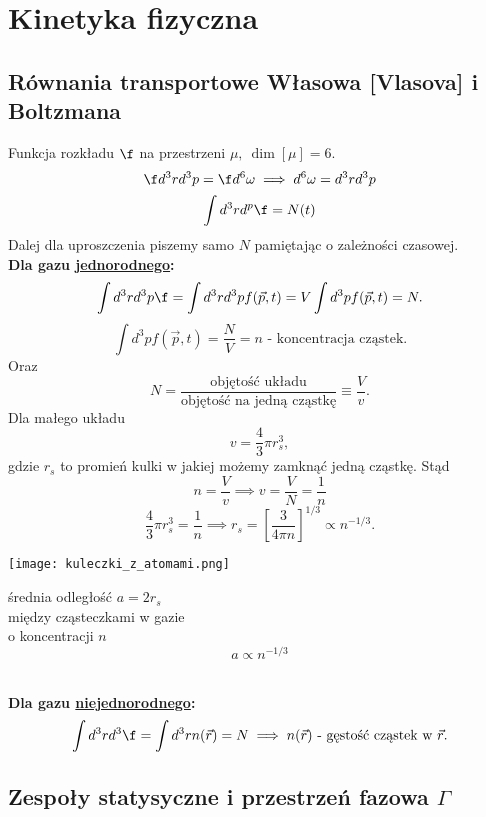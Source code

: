 \section{Kinetyka fizyczna}
\subsection{Równania transportowe Własowa [Vlasova] i Boltzmana}
Funkcja rozkładu $\f$ na przestrzeni $\mu,\ \dim[\mu]=6.$
\begin{equation} \f d^3rd^3p = \f d^6\omega \implies d^6\omega 
= d^3rd^3p \end{equation}
\begin{equation} \int d^3rd^p\f = N(t) \end{equation}
Dalej dla uproszczenia piszemy samo $N$ pamiętając o zależności czasowej.\\

\textbf{Dla gazu \underline{jednorodnego}:}
$$ \int d^3rd^3p \f = \int d^3rd^3pf(\vec{p},t) = V \int d^3p f(\vec{p},t)=N.$$
\begin{equation}
\int d^3p f(\vec{p},t) = \frac{N}{V} = n \mbox{ - koncentracja cząstek.}
\end{equation}
Oraz
\begin{equation}
N = \frac{\mbox{objętość układu}}{\mbox{objętość na jedną cząstkę}} \equiv 
\frac{V}{v}.
\end{equation}
Dla małego układu 
\begin{equation}
v=\frac{4}{3} \pi r_s^3 ,
\end{equation}
gdzie $r_s$ to promień kulki w jakiej możemy zamknąć jedną cząstkę. Stąd
$$ n = \frac{V}{v} \implies v=\frac{V}{N} = \frac{1}{n}$$
$$ \frac{4}{3} \pi r_s^3 = \frac{1}{n} \implies r_s = \left[ \frac{3}{4\pi n}
\right]^{1/3} \propto n^{-1/3}.$$
\begin{center}
\begin{minipage}{0.3\textwidth}
\texttt{[image: kuleczki\_z\_atomami.png]}
\end{minipage}
\begin{minipage}{0.4\textwidth}
średnia odległość $a=2r_s$ \\
między cząsteczkami w gazie \\
o koncentracji $n$ \\
$$a \propto n^{-1/3}$$ \vspace{-5mm}\\
\end{minipage}
\end{center}

\textbf{Dla gazu \underline{niejednorodnego}:}
\begin{equation}
\int d^3rd^3\f = \int d^3r n(\vec{r}) = N \implies n(\vec{r}) 
\mbox{ - gęstość cząstek w } \vec{r}.
\end{equation}
\subsection{Zespoły statysyczne i przestrzeń fazowa $\Gamma$}

